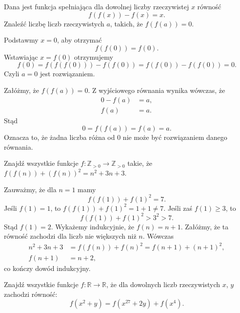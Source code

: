 \newpage
{}

\begin{problem}{1}
	Dana jest funkcja spełniająca dla dowolnej liczby rzeczywistej $x$ równość
	\[
		f(f(x)) - f(x) = x.
	\]
	Znaleźć liczbę liczb rzeczywistych $a$, takich, że $f(f(a)) = 0$.
\end{problem}


\noindent
Podstawmy $x = 0$, aby otrzymać
\[
	f(f(0)) = f(0).
\]
Wstawiając $x = f(0)$ otrzymujemy
\[
	f(0) = f(f(f(0))) - f(f(0)) = f(f(0)) - f(f(0)) = 0.
\]
Czyli $a = 0$ jest rozwiązaniem.

\vspace{10px}

\noindent
Załóżmy, że $f(f(a)) = 0$. Z wyjściowego równania wynika wówczas, że
\begin{align*}
	0 - f(a) &= a, \\
	f(a) &= a.
\end{align*}
Stąd
\[
	0 = f(f(a)) = f(a) = a.
\]
Oznacza to, że żadna liczba różna od $0$ nie może być rozwiązaniem danego równania.

\begin{problem}{2}
	Znajdź wszystkie funkcje  $ f: \mathbb{Z}_{>0} \to \mathbb{Z}_{>0}$ takie, że  $f(f(n)) + (f(n))^2 = n^2 + 3n + 3$.
\end{problem}


\noindent
Zauważmy, że dla $n = 1$ mamy
\[
	f(f(1)) + f(1)^2 = 7.
\]
Jeśli $f(1) = 1$, to $f(f(1)) + f(1)^2 = 1 + 1 \neq 7$. Jeśli zaś $f(1) \geqslant 3$, to
\[
	f(f(1)) + f(1)^2 > 3^2 > 7.
\]
Stąd $f(1) = 2$. Wykażemy indukcyjnie, że $f(n) = n + 1$. Załóżmy, że ta równość zachodzi dla liczb nie większych niż $n$. Wówczas
\begin{align*}
	n^2 + 3n + 3 &= f(f(n)) + f(n)^2 = f(n + 1) + (n + 1)^2, \\
	f(n + 1) &= n + 2,
\end{align*}
co kończy dowód indukcyjny. 

\begin{problem}{3}
	Znajdź wszystkie funkcje $f:\mathbb{R} \to \mathbb{R}$, że dla dowolnych liczb rzeczywistych $x$, $y$ zachodzi równość:
	\[
		f(x^2 + y) = f(x^{27} + 2y) + f(x^4).
	\]
\end{problem}


